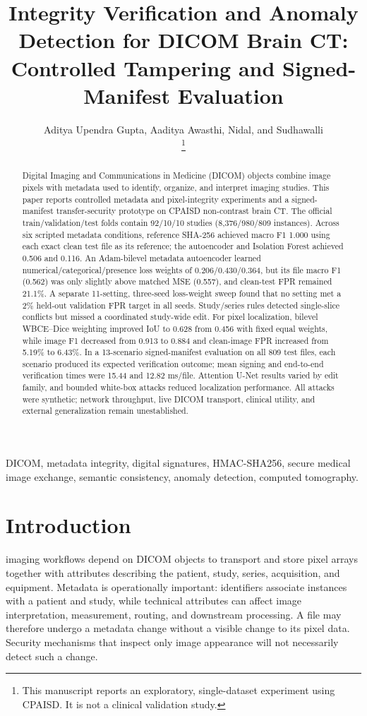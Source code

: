 \documentclass[journal]{IEEEtran}
\title{Integrity Verification and Anomaly Detection for DICOM Brain CT: Controlled Tampering and Signed-Manifest Evaluation}
\author{Aditya Upendra Gupta, Aaditya Awasthi, Nidal, and Sudhawalli\\
  \thanks{This manuscript reports an exploratory, single-dataset experiment using CPAISD. It is not a clinical validation study.}}
\begin{document}
  \maketitle
  
  \begin{abstract}
Digital Imaging and Communications in Medicine (DICOM) objects combine image pixels with metadata used to identify, organize, and interpret imaging studies. This paper reports controlled metadata and pixel-integrity experiments and a signed-manifest transfer-security prototype on CPAISD non-contrast brain CT. The official train/validation/test folds contain 92/10/10 studies (8,376/980/809 instances). Across six scripted metadata conditions, reference SHA-256 achieved macro F1 1.000 using each exact clean test file as its reference; the autoencoder and Isolation Forest achieved 0.506 and 0.116. An Adam-bilevel metadata autoencoder learned numerical/categorical/presence loss weights of 0.206/0.430/0.364, but its file macro F1 (0.562) was only slightly above matched MSE (0.557), and clean-test FPR remained 21.1\%. A separate 11-setting, three-seed loss-weight sweep found that no setting met a 2\% held-out validation FPR target in all seeds. Study/series rules detected single-slice conflicts but missed a coordinated study-wide edit. For pixel localization, bilevel WBCE--Dice weighting improved IoU to 0.628 from 0.456 with fixed equal weights, while image F1 decreased from 0.913 to 0.884 and clean-image FPR increased from 5.19\% to 6.43\%. In a 13-scenario signed-manifest evaluation on all 809 test files, each scenario produced its expected verification outcome; mean signing and end-to-end verification times were 15.44 and 12.82 ms/file. Attention U-Net results varied by edit family, and bounded white-box attacks reduced localization performance. All attacks were synthetic; network throughput, live DICOM transport, clinical utility, and external generalization remain unestablished.
  \end{abstract}
  
  \begin{IEEEkeywords}
  DICOM, metadata integrity, digital signatures, HMAC-SHA256, secure medical image exchange, semantic consistency, anomaly detection, computed tomography.
  \end{IEEEkeywords}
  
  \section{Introduction}
   imaging workflows depend on DICOM objects to transport and store pixel arrays together with attributes describing the patient, study, series, acquisition, and equipment. Metadata is operationally important: identifiers associate instances with a patient and study, while technical attributes can affect image interpretation, measurement, routing, and downstream processing. A file may therefore undergo a metadata change without a visible change to its pixel data. Security mechanisms that inspect only image appearance will not necessarily detect such a change.
  
\end{document}
